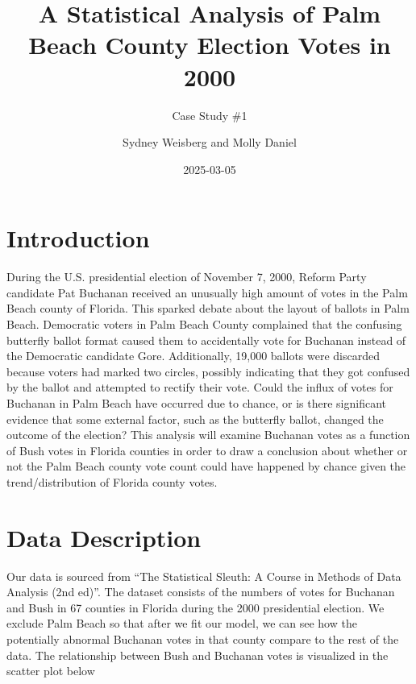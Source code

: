 \documentclass[
  letterpaper,
  DIV=11,
  numbers=noendperiod]{scrartcl}
\title{A Statistical Analysis of Palm Beach County Election Votes in
2000}
\subtitle{Case Study \#1}
\author{Sydney Weisberg and Molly Daniel}
\date{2025-03-05}
\begin{document}
\maketitle
\ifdefined\Shaded\renewenvironment{Shaded}{\begin{tcolorbox}[boxrule=0pt, interior hidden, borderline west={3pt}{0pt}{shadecolor}, enhanced, sharp corners, breakable, frame hidden]}{\end{tcolorbox}}\fi

\hypertarget{introduction}{%
\section{Introduction}\label{introduction}}

During the U.S. presidential election of November 7, 2000, Reform Party
candidate Pat Buchanan received an unusually high amount of votes in the
Palm Beach county of Florida. This sparked debate about the layout of
ballots in Palm Beach. Democratic voters in Palm Beach County complained
that the confusing butterfly ballot format caused them to accidentally
vote for Buchanan instead of the Democratic candidate Gore.
Additionally, 19,000 ballots were discarded because voters had marked
two circles, possibly indicating that they got confused by the ballot
and attempted to rectify their vote. Could the influx of votes for
Buchanan in Palm Beach have occurred due to chance, or is there
significant evidence that some external factor, such as the butterfly
ballot, changed the outcome of the election? This analysis will examine
Buchanan votes as a function of Bush votes in Florida counties in order
to draw a conclusion about whether or not the Palm Beach county vote
count could have happened by chance given the trend/distribution of
Florida county votes.

\hypertarget{data-description}{%
\section{Data Description}\label{data-description}}

Our data is sourced from ``The Statistical Sleuth: A Course in Methods
of Data Analysis (2nd ed)''. The dataset consists of the numbers of
votes for Buchanan and Bush in 67 counties in Florida during the 2000
presidential election. We exclude Palm Beach so that after we fit our
model, we can see how the potentially abnormal Buchanan votes in that
county compare to the rest of the data. The relationship between Bush
and Buchanan votes is visualized in the scatter plot below
\end{document}
